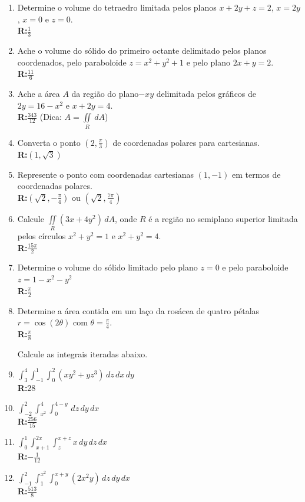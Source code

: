 \documentclass[oneside,a4paper,12pt]{article}
\newcommand{\R}{\\{\bf R:}}
\newcommand{\iintR}{\displaystyle \iint \limits_R}
\begin{document}
\begin{enumerate}
	\item Determine o volume do tetraedro limitada pelos planos $x+2y+z=2$, $x=2y$, $x=0$ e $z=0$. \R $\displaystyle \frac{1}{3}$
	
	\item Ache o volume do sólido do primeiro octante delimitado pelos planos coordenados, pelo paraboloide $z=x^2+y^2+1$ e pelo plano $2x+y=2$. \R $\displaystyle \frac{11}{6}$
	
	\item Ache a área $A$ da região do plano$-xy$ delimitada pelos gráficos de $2y=16-x^2$ e $x+2y=4$. \R $\displaystyle \frac{343}{12}$ (Dica: $A = \iintR \,dA$)
	
	\item Converta o ponto $\left(2,\displaystyle \frac{\pi}{3}\right)$ de coordenadas polares para cartesianas. \R $\left(1,\sqrt{3}\right)$
	
	\item Represente o ponto com coordenadas cartesianas $(1,-1)$ em termos de coordenadas polares. \R $\left(\sqrt{2},\displaystyle -\frac{\pi}{4}\right)$ ou $\left(\sqrt{2},\displaystyle \frac{7\pi}{4}\right)$
	
	\item Calcule $\iintR(3x+4y^2)\,dA$, onde $R$ é a região no semiplano superior limitada pelos círculos $x^2+y^2=1$ e $x^2+y^2=4$. \R$\displaystyle \frac{15\pi}{2}$
	
	\item Determine o volume do sólido limitado pelo plano $z=0$ e pelo paraboloide $z = 1-x^2-y^2$ \R $\displaystyle \frac{\pi}{2}$
	
	\item Determine a área contida em um laço da rosácea de quatro pétalas $r=\cos(2\theta)$ com $\theta = \displaystyle \frac{\pi}{4}$. \R $\displaystyle \frac{\pi}{8}$
	
	Calcule as integrais iteradas abaixo.
	
	\item $\displaystyle \int_{3}^{4}\!\!\int_{-1}^{1}\!\int_{0}^{2} \left(xy^2+yz^3\right)\,dz\,dx\,dy$ \R $28$
	
	\item $\displaystyle \int_{-2}^{2}\!\!\int_{x^2}^{4}\!\int_{0}^{4-y} \,dz\,dy\,dx$ \R $\displaystyle\frac{256}{15}$
	
	\item $\displaystyle \int_{0}^{1}\!\!\int_{x+1}^{2x}\!\int_{z}^{x+z} x\,dy\,dz\,dx$ \R $\displaystyle -\frac{1}{12}$
	
	\item $\displaystyle \int_{-1}^{2}\!\!\int_{1}^{x^2}\!\!\int_{0}^{x+y} \left(2x^2y\right)\,dz\,dy\,dx$ \R $\displaystyle \frac{513}{8}$
	

\end{enumerate}
\end{document}
